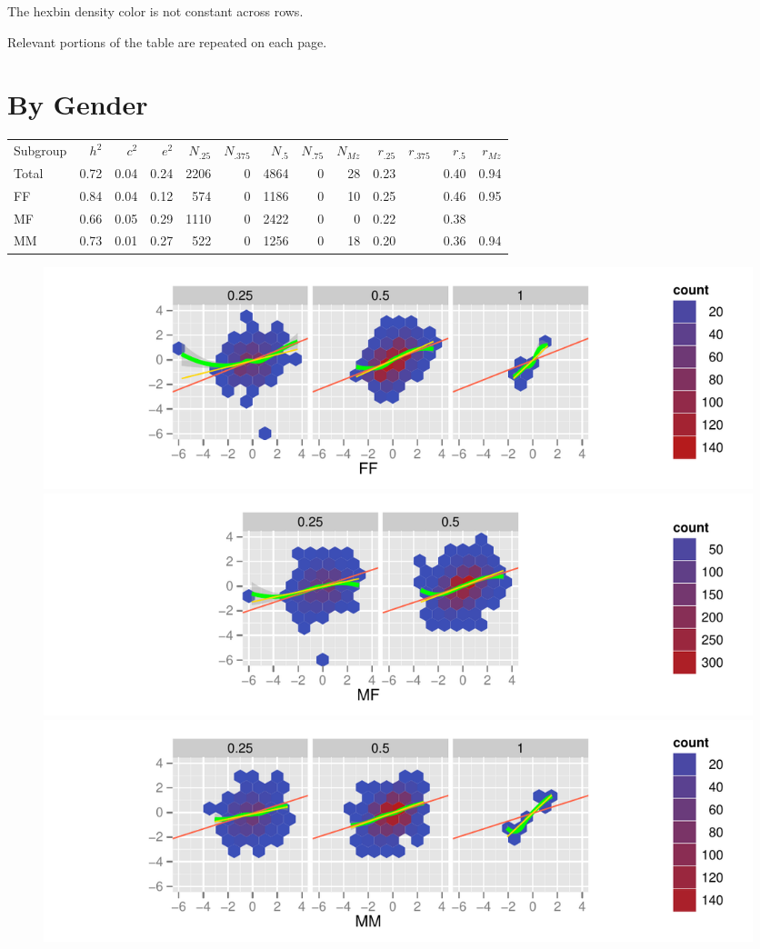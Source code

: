 \documentclass[a4paper]{article}
\begin{document}
The hexbin density color is not constant across rows.

Relevant portions of the table are repeated on each page.
\newpage
\section{By Gender}
\begin{table}[ht]
\begin{center}
\begin{tabular}{l|rrr|rrrrr|rrrr}
 Subgroup & $h^2$ & $c^2$ & $e^2$ & $N_{.25}$ & $N_{.375}$ & $N_{.5}$ & $N_{.75}$ & $N_{Mz}$ & $r_{.25}$ & $r_{.375}$ & $r_{.5}$ & $r_{Mz}$ \\ 
 Total & 0.72 & 0.04 & 0.24 & 2206 &   0 & 4864 &   0 &  28 & 0.23 &  & 0.40 & 0.94 \\ 
   \hline
FF & 0.84 & 0.04 & 0.12 & 574 &   0 & 1186 &   0 &  10 & 0.25 &  & 0.46 & 0.95 \\ 
  MF & 0.66 & 0.05 & 0.29 & 1110 &   0 & 2422 &   0 &   0 & 0.22 &  & 0.38 &  \\ 
  MM & 0.73 & 0.01 & 0.27 & 522 &   0 & 1256 &   0 &  18 & 0.20 &  & 0.36 & 0.94 \\ 
  \end{tabular}
\end{center}
\end{table}\begin{figure}[htbp]
\includegraphics{Height-006}
\includegraphics{Height-007}
\includegraphics{Height-008}
\end{figure}
\end{document}
